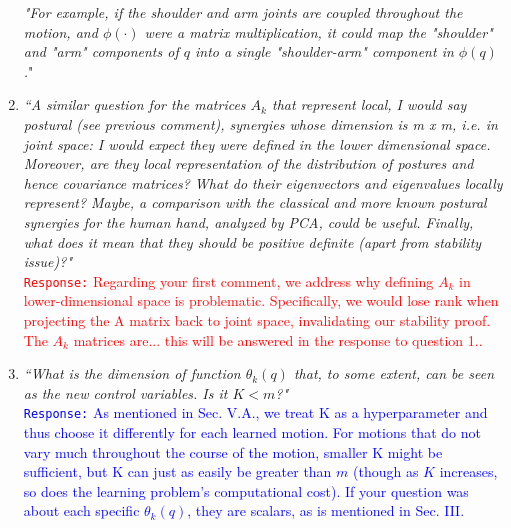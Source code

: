 \documentclass[10pt,stdletter,dateno]{newlfm}
\begin{document}
\begin{newlfm}
\begin{enumerate}
{\textit{"For example, if the shoulder and arm joints are coupled throughout the motion, and $\phi(\cdot)$ were a matrix multiplication, it could map the "shoulder" and "arm" components of $q$ into a single "shoulder-arm" component in $\phi(q)$.}}"\\

\item \textit{``A similar question for the matrices $A_k$ that represent local, I
	would say postural (see previous comment), synergies whose dimension is
	m x m, i.e. in joint space: I would expect they were defined in the
	lower dimensional space. Moreover, are they local representation of the
	distribution of postures and hence covariance matrices? What do their
	eigenvectors and eigenvalues locally represent? Maybe, a comparison
	with the classical and more known postural synergies for the human
	hand, analyzed by PCA, could be useful. Finally, what does it mean that
	they should be positive definite (apart from stability issue)?"}\\
\textcolor{red}{\texttt{Response:} \small Regarding your first comment, we address why defining $A_k$ in lower-dimensional space is problematic. Specifically, we would lose rank when projecting the A matrix back to joint space, invalidating our stability proof. The $A_k$ matrices are... this will be answered in the response to question 1..}\\

\item \textit{``What is the dimension of function $\theta_k(q)$ that, to some extent,
	can be seen as the new control variables. Is it $K<m$?"}\\
\textcolor{blue}{\texttt{Response:} \small As mentioned in Sec. V.A., we treat K as a hyperparameter and thus choose it differently for each learned motion. For motions that do not vary much throughout the course of the motion, smaller K might be sufficient, but K can just as easily be greater than $m$ (though as $K$ increases, so does the learning problem's computational cost).
If your question was about each specific $\theta_k(q)$, they are scalars, as is mentioned in Sec. III.}\\


\end{enumerate}
\end{newlfm}
\end{document}
